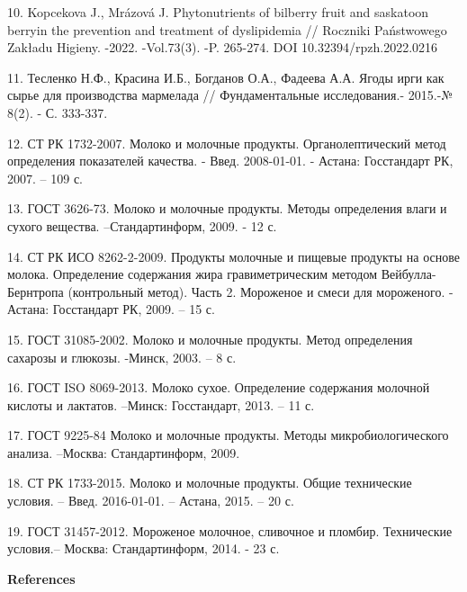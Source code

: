 \begin{references}
10. Kopcekova J., Mrázová J. Phytonutrients of bilberry fruit and
saskatoon berryin the prevention and treatment of dyslipidemia //
Roczniki Państwowego Zakładu Higieny. -2022. -Vol.73(3). -P. 265-274.
DOI 10.32394/rpzh.2022.0216

11. Тесленко Н.Ф., Красина И.Б., Богданов О.А., Фадеева А.А. Ягоды ирги
как сырье для производства мармелада // Фундаментальные исследования.-
2015.-№ 8(2). - С. 333-337.

12. СТ РК 1732-2007. Молоко и молочные продукты. Органолептический метод
определения показателей качества. - Введ. 2008-01-01. - Астана:
Госстандарт РК, 2007. -- 109 с.

13. ГОСТ 3626-73. Молоко и молочные продукты. Методы определения влаги и
сухого вещества. --Стандартинформ, 2009. - 12 с.

14. СТ РК ИСО 8262-2-2009. Продукты молочные и пищевые продукты на основе
молока. Определение содержания жира гравиметрическим методом
Вейбулла-Бернтропа (контрольный метод). Часть 2. Мороженое и смеси для
мороженого. - Астана: Госстандарт РК, 2009. -- 15 с.

15. ГОСТ 31085-2002. Молоко и молочные продукты. Метод
определения сахарозы и глюкозы. -Минск, 2003. -- 8 с.

16. ГОСТ ISO 8069-2013. Молоко сухое. Определение содержания
молочной кислоты и лактатов. --Минск: Госстандарт, 2013. -- 11 с.

17. ГОСТ 9225-84 Молоко и молочные продукты. Методы микробиологического
анализа. --Москва: Стандартинформ, 2009.

18. СТ РК 1733-2015. Молоко и молочные продукты. Общие технические
условия. -- Введ. 2016-01-01. -- Астана, 2015. -- 20 с.

19. ГОСТ 31457-2012. Мороженое молочное, сливочное и пломбир.
Технические условия.-- Москва: Стандартинформ, 2014. - 23 с.
\end{references}

\begin{center}
{\bfseries References}
\end{center}


